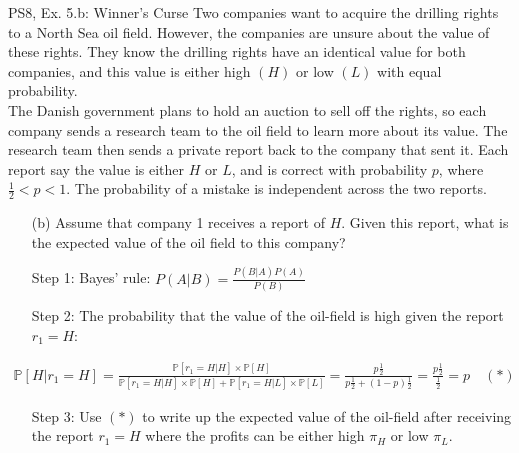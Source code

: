 \begin{frame}{PS8, Ex. 5.b: Winner's Curse}
      Two companies want to acquire the drilling rights to a North Sea oil field. However, the companies are unsure about the value of these rights. They know the drilling rights have an identical value for both companies, and this value is either high $(H)$ or low $(L)$ with equal probability.\\\smallskip
      The Danish government plans to hold an auction to sell off the rights, so each company sends a research team to the oil field to learn more about its value. The research team then sends a private report back to the company that sent it. Each report say the value is either $H$ or $L$, and is correct with probability $p$, where $\frac{1}{2} < p < 1$. The probability of a mistake is independent across the two reports.
      \begin{itemize}
        \item[(b)] Assume that company 1 receives a report of $H$. Given this report, what is the expected value of the oil field to this company?
        \item[Step 1:] Bayes' rule: $P(A|B)=\frac{P(B|A)P(A)}{P(B)}$
        \item[Step 2:] The probability that the value of the oil-field is high given the report $r_1=H$:
      \end{itemize}
      \vspace{-8pt}
      \begin{align*}
        \mathbb{P}[H|r_1=H]=\frac{\mathbb{P}[r_1=H|H]\times\mathbb{P}[H]}{\mathbb{P}[r_1=H|H]\times\mathbb{P}[H]+\mathbb{P}[r_1=H|L]\times\mathbb{P}[L]}=\frac{p\frac{1}{2}}{p\frac{1}{2}+(1-p)\frac{1}{2}}=\frac{p\frac{1}{2}}{\frac{1}{2}}=p\quad (*)
      \end{align*}
      \vspace{-10pt}
      \begin{itemize}
        \item[Step 3:] Use $(*)$ to write up the expected value of the oil-field after receiving the report $r_1=H$ where the profits can be either high $\pi_H$ or low $\pi_L$.
      \end{itemize}
      \vfill\null
\end{frame}
